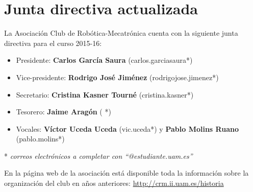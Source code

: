 \documentclass[12pt,twoside]{report}
\begin{document}
\chapter{Junta directiva actualizada}

La Asociación Club de Robótica-Mecatrónica cuenta con la siguiente junta directiva para el curso 2015-16:

\begin{itemize}
\item Presidente: \textbf{Carlos García Saura} (carlos.garciasaura*)
\item Vice-presidente: \textbf{Rodrigo José Jiménez} (rodrigojose.jimenez*)
\item Secretario: \textbf{Cristina Kasner Tourné} (cristina.kasner*)
\item Tesorero: \textbf{Jaime Aragón} ( *)
\item Vocales: \textbf{Víctor Uceda Uceda} (vic.uceda*) y \textbf{Pablo Molins Ruano} (pablo.molins*)
\end{itemize}

* \textit{correos electrónicos a completar con ``@estudiante.uam.es''}

En la página web de la asociación está disponible toda la información sobre la organización del club en años anteriores:
\url{http://crm.ii.uam.es/historia}
\end{document}
